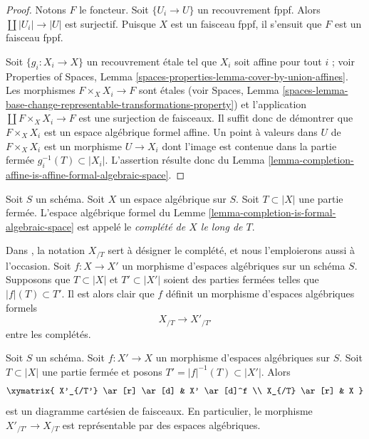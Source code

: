 \begin{proof}
Notons $F$ le foncteur. Soit $\{U_i \to U\}$ un recouvrement fppf.
Alors $\coprod |U_i| \to |U|$ est surjectif. Puisque $X$ est un
faisceau fppf, il s'ensuit que $F$ est un faisceau fppf.

\medskip\noindent
Soit $\{g_i : X_i \to X\}$ un recouvrement étale tel que $X_i$ soit affine
pour tout $i$ ; voir Properties of Spaces, Lemma
\ref{spaces-properties-lemma-cover-by-union-affines}.
Les morphismes $F \times_X X_i \to F$ sont étales
(voir Spaces, Lemma
\ref{spaces-lemma-base-change-representable-transformations-property})
et l'application $\coprod F \times_X X_i \to F$ est une surjection de faisceaux.
Il suffit donc de démontrer que $F \times_X X_i$ est un espace algébrique
formel affine. Un point à valeurs dans $U$ de $F \times_X X_i$ est un
morphisme $U \to X_i$ dont l'image est contenue dans la partie fermée
$g_i^{-1}(T) \subset |X_i|$. L'assertion résulte donc du
Lemma \ref{lemma-completion-affine-is-affine-formal-algebraic-space}.
\end{proof}

\begin{definition}
\label{definition-completion}
Soit $S$ un schéma. Soit $X$ un espace algébrique sur $S$.
Soit $T \subset |X|$ une partie fermée. L'espace algébrique formel
du Lemme \ref{lemma-completion-is-formal-algebraic-space}
est appelé le {\it complété de $X$ le long de $T$}.
\end{definition}

\noindent
Dans \cite[Chapter I, Section 10.8]{EGA}, la notation $X_{/T}$
sert à désigner le complété, et nous l'emploierons aussi
à l'occasion. Soit $f : X \to X'$ un
morphisme d'espaces algébriques sur un schéma $S$. Supposons
que $T \subset |X|$ et $T' \subset |X'|$ soient des parties fermées
telles que $|f|(T) \subset T'$. Il est alors clair que
$f$ définit un morphisme d'espaces algébriques formels
$$
X_{/T} \longrightarrow X'_{/T'}
$$
entre les complétés.

\begin{lemma}
\label{lemma-map-completions-representable}
Soit $S$ un schéma. Soit $f : X' \to X$ un morphisme
d'espaces algébriques sur $S$. Soit $T \subset |X|$
une partie fermée et posons $T' = |f|^{-1}(T) \subset |X'|$.
Alors
$$
\xymatrix{
X'_{/T'} \ar[r] \ar[d] & X' \ar[d]^f \\
X_{/T} \ar[r] & X
}
$$
est un diagramme cartésien de faisceaux. En particulier, le morphisme
$X'_{/T'} \to X_{/T}$ est représentable par des espaces algébriques.
\end{lemma}

